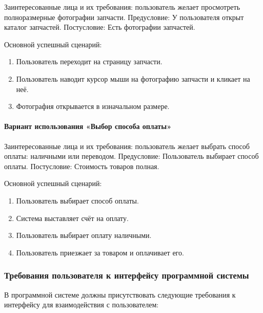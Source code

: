 Заинтересованные лица и их требования: пользователь желает просмотреть полноразмерные фотографии запчасти.
Предусловие: У пользователя открыт каталог запчастей.
Постусловие: Есть фотографии запчастей.

Основной успешный сценарий:
\begin{enumerate}
	\item Пользователь переходит на страницу запчасти.
	\item Пользователь наводит курсор мыши на фотографию запчасти и кликает на неё.
	\item Фотография открывается в изначальном размере.
\end{enumerate}

\paragraph{Вариант использования «Выбор способа оплаты»}

Заинтересованные лица и их требования: пользователь желает выбрать способ оплаты: наличными или переводом.
Предусловие: Пользователь выбирает способ оплаты.
Постусловие: Стоимость товаров полная.

Основной успешный сценарий:
\begin{enumerate}
	\item Пользователь выбирает способ оплаты.
	\item Система выставляет счёт на оплату.
	\item Пользователь выбирает оплату наличными.
	\item Пользователь приезжает за товаром и оплачивает его.
\end{enumerate}

\subsubsection{Требования пользователя к интерфейсу программной системы}

В программной системе должны присутствовать следующие требования к интерфейсу для взаимодействия с пользователем:


